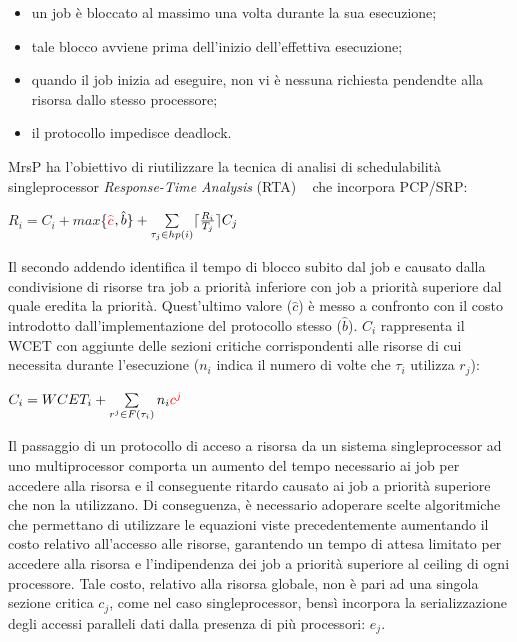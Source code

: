 \begin{itemize}
\item un job è bloccato al massimo una volta durante la sua esecuzione;
\item tale blocco avviene prima dell’inizio dell’effettiva esecuzione;
\item quando il job inizia ad eseguire, non vi è nessuna richiesta pendendte alla risorsa dallo stesso processore;
\item il protocollo impedisce deadlock.
\end{itemize}

MrsP ha l’obiettivo di riutilizzare la tecnica di analisi di schedulabilità singleprocessor \textit{Response-Time Analysis} (RTA) ~\cite{Audsley93applyingnew} che incorpora PCP/SRP:\\

\centerline{$R_i = C_i + max$\{\textcolor{red}{$\hat{c}$}$,\hat{b}\} + \sum\limits_{\tau_j \in hp(i)} \lceil\frac{R_i}{T_j}\rceil C_j$}

\vspace{4 mm}

Il secondo addendo identifica il tempo di blocco subito dal job e causato dalla condivisione di risorse tra job a priorità inferiore con job a priorità superiore dal quale eredita la priorità. Quest'ultimo valore ($\hat{c}$) è messo a confronto con il costo introdotto dall'implementazione del protocollo stesso ($\hat{b}$). $C_i$ rappresenta il WCET con aggiunte delle sezioni critiche corrispondenti alle risorse di cui necessita durante l’esecuzione ($n_i$ indica il numero di volte che $\tau_i$ utilizza $r_j$):\\

\centerline{$C_i = WCET_i + \sum\limits_{r^j \in F(\tau_i)} n_i \textcolor{red}{c^j}$}

\vspace{4 mm}

Il passaggio di un protocollo di acceso a risorsa da un sistema singleprocessor ad uno multiprocessor comporta un aumento del tempo necessario ai job per accedere alla risorsa e il conseguente ritardo causato ai job a priorità superiore che non la utilizzano. Di conseguenza, è necessario adoperare scelte algoritmiche che permettano di utilizzare le equazioni viste precedentemente aumentando il costo relativo all’accesso alle risorse, garantendo un tempo di attesa limitato per accedere alla risorsa e l'indipendenza dei job a priorità superiore al ceiling di ogni processore. Tale costo, relativo alla risorsa globale, non è pari ad una singola sezione critica $c_j$, come nel caso singleprocessor, bensì incorpora la serializzazione degli accessi paralleli dati dalla presenza di più processori: $e_j$.\\

